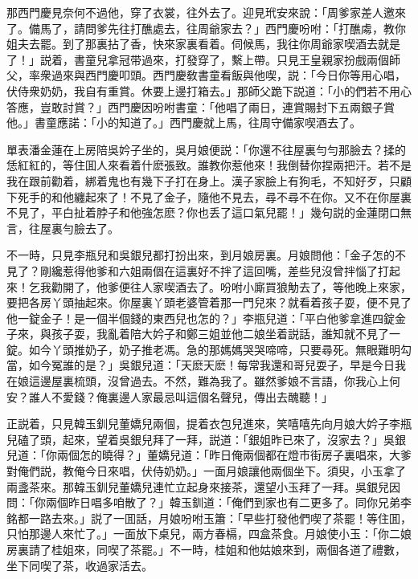 那西門慶見奈何不過他，穿了衣裳，往外去了。迎見玳安來說：「周爹家差人邀來了。備馬了，請問爹先往打醮處去，往周爺家去？」西門慶吩咐：「打醮䖏，教你姐夫去罷。到了那裏拈了香，快來家裏看着。伺候馬，我往你周爺家喫酒去就是了！」説着，書童兒拿冠带過來，打發穿了，繫上帶。只見王皇親家扮戲兩個師父，率衆過來與西門慶叩頭。西門慶敎書童看飯與他喫，説：「今日你等用心唱，伏侍衆奶奶，我自有重賞。休要上邊打箱去。」那師父跪下説道：「小的們若不用心答應，豈敢討賞？」西門慶因吩咐書童：「他唱了兩日，連賞賜封下五兩銀子賞他。」書童應諾：「小的知道了。」西門慶就上馬，往周守備家喫酒去了。

單表潘金蓮在上房陪吳妗子坐的，吳月娘便説：「你還不往屋裏勻勻那臉去？揉的恁紅紅的，等住囬人來看着什麽張致。誰教你惹他來！我倒替你捏兩把汗。若不是我在跟前勸着，綁着鬼也有幾下子打在身上。漢子家臉上有狗毛，不知好歹，只顧下死手的和他纏起來了！不見了金子，隨他不見去，尋不尋不在你。又不在你屋裏不見了，平白扯着脖子和他強怎麽？你也丢了這口氣兒罷！」幾句説的金蓮閉口無言，往屋裏勻臉去了。

不一時，只見李瓶兒和吳銀兒都打扮出來，到月娘房裏。月娘問他：「金子怎的不見了？剛纔惹得他爹和六姐兩個在這裏好不拌了這回嘴，差些兒沒曾拌惱了打起來！乞我勸開了，他爹便往人家喫酒去了。吩咐小廝買狼觔去了，等他晚上來家，要把各房丫頭抽起來。你屋裏丫頭老婆管着那一門兒來？就看着孩子耍，便不見了他一錠金子！是一個半個錢的東西兒也怎的？」李瓶兒道：「平白他爹拿進四錠金子來，與孩子耍，我亂着陪大妗子和鄭三姐並他二娘坐着説話，誰知就不見了一錠。如今丫頭推奶子，奶子推老馮。急的那媽媽哭哭啼啼，只要尋死。無眼難明勾當，如今冤誰的是？」吳銀兒道：「天麽天麽！每常我還和哥兒耍子，早是今日我在娘這邊屋裏梳頭，沒曾過去。不然，難為我了。雖然爹娘不言語，你我心上何安？誰人不愛錢？俺裏邊人家最忌叫這個名聲兒，傳出去醜聽！」

正説着，只見韓玉釧兒董嬌兒兩個，提着衣包兒進來，笑嘻嘻先向月娘大妗子李瓶兒磕了頭，起來，望着吳銀兒拜了一拜，説道：「銀姐昨已來了，沒家去？」吳銀兒道：「你兩個怎的曉得？」董嬌兒道：「昨日俺兩個都在燈巿街房子裏唱來，大爹對俺們説，教俺今日來唱，伏侍奶奶。」一面月娘讓他兩個坐下。須臾，小玉拿了兩盞茶來。那韓玉釧兒董嬌兒連忙立起身來接茶，還望小玉拜了一拜。吳銀兒因問：「你兩個昨日唱多咱散了？」韓玉釧道：「俺們到家也有二更多了。同你兄弟李銘都一路去來。」説了一囬話，月娘吩咐玉簫：「早些打發他們喫了茶罷！等住囬，只怕那邊人來忙了。」一面放下桌兒，兩方春槅，四盒茶食。月娘使小玉：「你二娘房裏請了桂姐來，同喫了茶罷。」不一時，桂姐和他姑娘來到，兩個各道了禮數，坐下同喫了茶，收過家活去。

